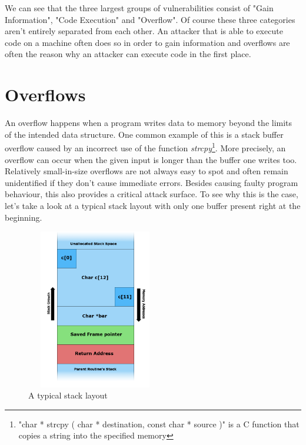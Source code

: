 \documentclass[10pt,twocolumn,a4paper]{article}
\begin{document}
We can see that the three largest groups of vulnerabilities consist of "Gain Information", "Code Execution" and "Overflow".
Of course these three categories aren't entirely separated from each other.
An attacker that is able to execute code on a machine often does so in order to gain information and overflows are often the reason why an attacker can execute code in the first place.
\section{Overflows}\label{sec:Overflows}
An overflow happens when a program writes data to memory beyond the limits of the intended data structure.
One common example of this is a stack buffer overflow caused by an incorrect use of the function \emph{strcpy}\footnote{"char * strcpy ( char * destination, const char * source )" is a C function that copies a string into the specified memory}.
More precisely, an overflow can occur when the given input is longer than the buffer one writes too.
Relatively small-in-size overflows are not always easy to spot and often remain unidentified if they don't cause immediate errors.
Besides causing faulty program behaviour, this also provides a critical attack surface.
To see why this is the case, let's take a look at a typical stack layout with only one buffer present right at the beginning.
\begin{figure}[h]
	\begin{center}
		\includegraphics[height=7cm,width=6cm]{fig/Stack_Overflow}
		\caption{A typical stack layout}
	\end{center}
\end{figure}
\newline
\end{document}
